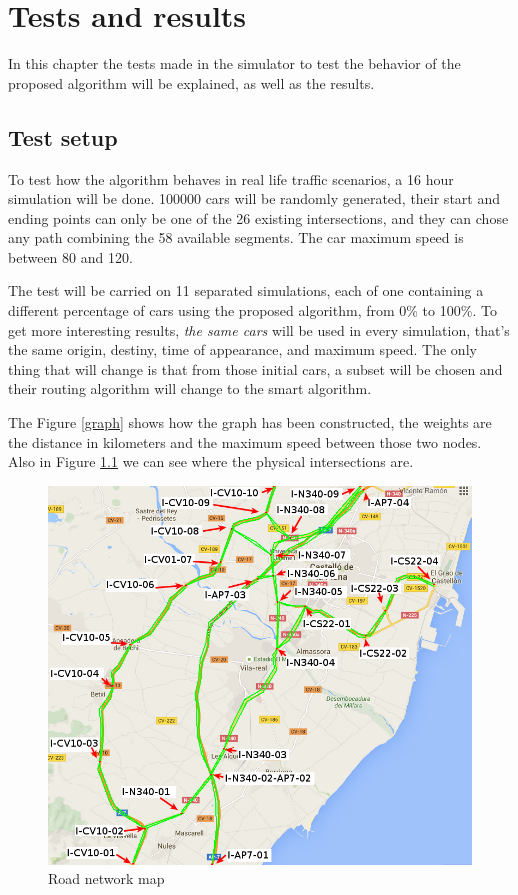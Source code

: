 \chapter{Tests and results}
\label{ch:tests}

In this chapter the tests made in the simulator to test the behavior of the proposed algorithm will be explained, as well as the results.

\section{Test setup}

To test how the algorithm behaves in real life traffic scenarios, a 16 hour simulation will be done. 100000 cars will be randomly generated, their start and ending points can only be one of the 26 existing intersections, and they can chose any path combining the 58 available segments. The car maximum speed is between 80 and 120.

The test will be carried on 11 separated simulations, each of one containing a different percentage of cars using the proposed algorithm, from 0\% to 100\%. To get more interesting results, \textit{the same cars} will be used in every simulation, that's the same origin, destiny, time of appearance, and maximum speed. The only thing that will change is that from those initial cars, a subset will be chosen and their routing algorithm will change to the smart algorithm.

The Figure \ref{graph} shows how the graph has been constructed, the weights are the distance in kilometers and the maximum speed between those two nodes. Also in Figure \ref{map} we can see where the physical intersections are.

\begin{figure}[!ht]
  \centering
  \includegraphics[scale=0.4]{images/map.png} 
  \caption{Road network map}
  \label{map}
\end{figure}

